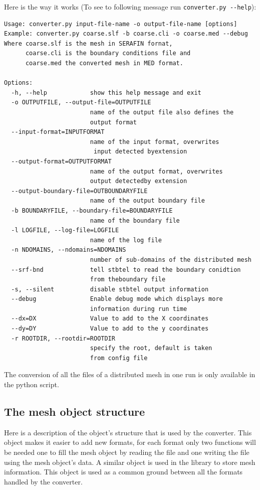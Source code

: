 Here is the way it works (To see to following message run \verb+converter.py --help+):
\begin{verbatim}
Usage: converter.py input-file-name -o output-file-name [options]
Example: converter.py coarse.slf -b coarse.cli -o coarse.med --debug
Where coarse.slf is the mesh in SERAFIN fornat,
      coarse.cli is the boundary conditions file and
      coarse.med the converted mesh in MED format.

Options:
  -h, --help            show this help message and exit
  -o OUTPUTFILE, --output-file=OUTPUTFILE
                        name of the output file also defines the
                        output format
  --input-format=INPUTFORMAT
                        name of the input format, overwrites
                         input detected byextension
  --output-format=OUTPUTFORMAT
                        name of the output format, overwrites
                        output detectedby extension
  --output-boundary-file=OUTBOUNDARYFILE
                        name of the output boundary file
  -b BOUNDARYFILE, --boundary-file=BOUNDARYFILE
                        name of the boundary file
  -l LOGFILE, --log-file=LOGFILE
                        name of the log file
  -n NDOMAINS, --ndomains=NDOMAINS
                        number of sub-domains of the distributed mesh
  --srf-bnd             tell stbtel to read the boundary conidtion
                        from theboundary file
  -s, --silent          disable stbtel output information
  --debug               Enable debug mode which displays more
                        information during run time
  --dx=DX               Value to add to the X coordinates
  --dy=DY               Value to add to the y coordinates
  -r ROOTDIR, --rootdir=ROOTDIR
                        specify the root, default is taken
                        from config file
\end{verbatim}

The conversion of all the files of a distributed mesh in one run is only
available in the python script.

\subsection{The mesh object structure}

Here is a description of the object's structure that is used by the converter.
This object makes it easier to add new formats, for each format only two
functions will be needed one to fill the mesh object by reading the file and
one writing the file using the mesh object's data.  A similar object is used in
the \bief library to store mesh information.  This object is used as a common
ground between all the formats handled by the converter.

